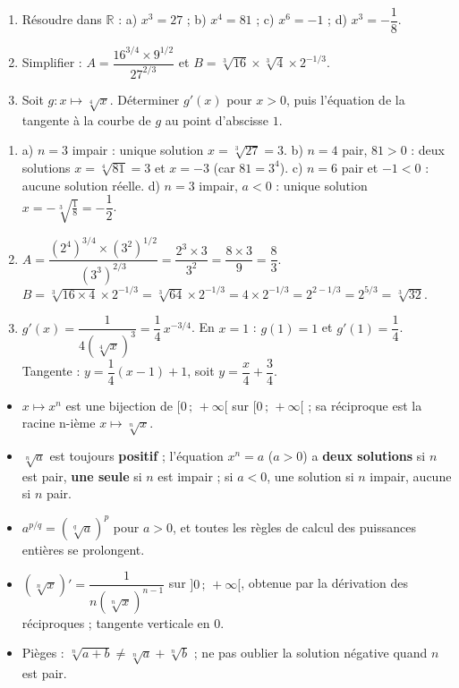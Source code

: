 \documentclass[11pt]{article}
\newcommand{\cle}[1]{{\popxbold\color{popdark}#1}}
\begin{document}
\begin{exercice}
\begin{enumerate}
\item Résoudre dans $\mathbb{R}$ : a) $x^3 = 27$ ; b) $x^4 = 81$ ; c) $x^6 = -1$ ; d) $x^3 = -\dfrac{1}{8}$.
\item Simplifier : $A = \dfrac{16^{3/4} \times 9^{1/2}}{27^{2/3}}$ et $B = \sqrt[3]{16} \times \sqrt[3]{4} \times 2^{-1/3}$.
\item Soit $g : x \mapsto \sqrt[4]{x}$. Déterminer $g'(x)$ pour $x > 0$, puis l'équation de la tangente à la courbe de $g$ au point d'abscisse $1$.
\end{enumerate}
\end{exercice}

\begin{corrige}[Exercice n°1]
\begin{enumerate}
\item a) $n = 3$ impair : unique solution $x = \sqrt[3]{27} = 3$. \quad b) $n = 4$ pair, $81 > 0$ : deux solutions $x = \sqrt[4]{81} = 3$ et $x = -3$ (car $81 = 3^4$). \quad c) $n = 6$ pair et $-1 < 0$ : aucune solution réelle. \quad d) $n = 3$ impair, $a < 0$ : unique solution $x = -\sqrt[3]{\frac{1}{8}} = -\dfrac{1}{2}$.
\item $A = \dfrac{(2^4)^{3/4} \times (3^2)^{1/2}}{(3^3)^{2/3}} = \dfrac{2^3 \times 3}{3^2} = \dfrac{8 \times 3}{9} = \dfrac{8}{3}$.\\
$B = \sqrt[3]{16 \times 4} \times 2^{-1/3} = \sqrt[3]{64} \times 2^{-1/3} = 4 \times 2^{-1/3} = 2^{2 - 1/3} = 2^{5/3} = \sqrt[3]{32}$.
\item $g'(x) = \dfrac{1}{4\left(\sqrt[4]{x}\right)^3} = \dfrac{1}{4}\,x^{-3/4}$. En $x = 1$ : $g(1) = 1$ et $g'(1) = \dfrac{1}{4}$. Tangente : $y = \dfrac{1}{4}(x - 1) + 1$, soit $y = \dfrac{x}{4} + \dfrac{3}{4}$.
\end{enumerate}
\end{corrige}

\begin{aretenir}
\begin{itemize}
\item $x \mapsto x^n$ est une bijection de $[0\,;\,+\infty[$ sur $[0\,;\,+\infty[$ ; sa réciproque est la \cle{racine n-ième} $x \mapsto \sqrt[n]{x}$.
\item $\sqrt[n]{a}$ est toujours \textbf{positif} ; l'équation $x^n = a$ ($a > 0$) a \textbf{deux solutions} si $n$ est pair, \textbf{une seule} si $n$ est impair ; si $a < 0$, une solution si $n$ impair, aucune si $n$ pair.
\item $a^{p/q} = \left(\sqrt[q]{a}\right)^p$ pour $a > 0$, et toutes les règles de calcul des puissances entières se prolongent.
\item $\left(\sqrt[n]{x}\right)' = \dfrac{1}{n\left(\sqrt[n]{x}\right)^{n-1}}$ sur $]0\,;\,+\infty[$, obtenue par la dérivation des réciproques ; tangente verticale en $0$.
\item Pièges : $\sqrt[n]{a+b} \neq \sqrt[n]{a} + \sqrt[n]{b}$ ; ne pas oublier la solution négative quand $n$ est pair.
\end{itemize}
\end{aretenir}
\end{document}
